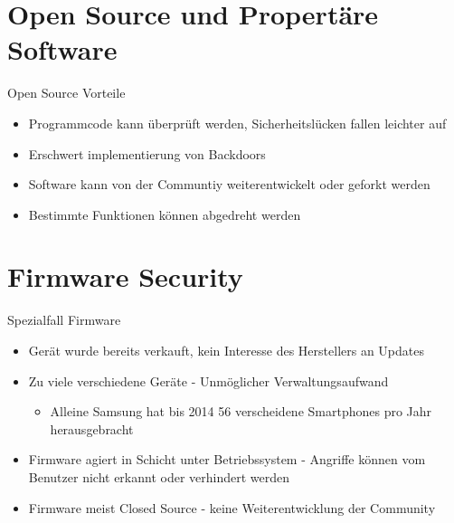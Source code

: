 \documentclass[10pt]{beamer}
\begin{document}
\section{Open Source und Propert\"are Software}

\begin{frame}[fragile]{Open Source Vorteile}
  \begin{itemize}
    \item Programmcode kann \"uberpr\"uft werden, Sicherheitsl\"ucken fallen leichter auf
    \item Erschwert implementierung von Backdoors
    \item Software kann von der Communtiy weiterentwickelt oder geforkt werden
    \item Bestimmte Funktionen k\"onnen abgedreht werden
  \end{itemize}
\end{frame}


\section{Firmware Security}
\begin{frame}[fragile]{Spezialfall Firmware}
  \begin{itemize}
    \item Ger\"at wurde bereits verkauft, kein Interesse des Herstellers an Updates
    \item Zu viele verschiedene Ger\"ate - Unm\"oglicher Verwaltungsaufwand
      \begin{itemize}
        \item Alleine Samsung hat bis 2014 56 verscheidene Smartphones pro Jahr herausgebracht
      \end{itemize}
    \item Firmware agiert in Schicht unter Betriebssystem - Angriffe k\"onnen vom Benutzer nicht erkannt oder verhindert werden
    \item Firmware meist Closed Source - keine Weiterentwicklung der Community
  \end{itemize}
\end{frame}
\end{document}
